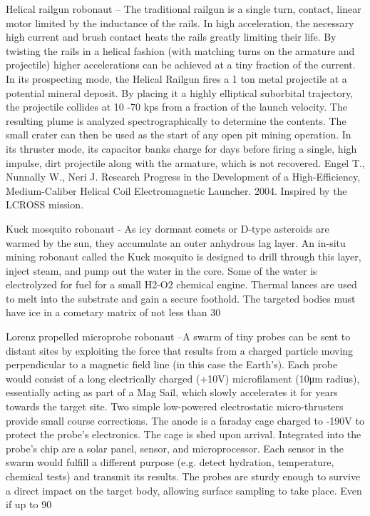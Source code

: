 \documentclass[a4paper]{book}
\begin{document}
Helical railgun robonaut – The traditional railgun is a single turn, contact, linear motor limited by the inductance of the rails.  In high acceleration, the necessary high current and brush contact heats the rails greatly limiting their life.  By twisting the rails in a helical fashion (with matching turns on the armature and projectile) higher accelerations can be achieved at a tiny fraction of the current. In its prospecting mode, the Helical Railgun fires a 1 ton metal projectile at a potential mineral deposit.  By placing it a highly elliptical suborbital trajectory, the projectile collides at 10 -70 kps from a fraction of the launch velocity. The resulting plume is analyzed spectrographically to determine the contents.  The small crater can then be used as the start of any open pit mining operation. In its thruster mode, its capacitor banks charge for days before firing a single, high impulse, dirt projectile along with the armature, which is not recovered. Engel T., Nunnally W., Neri J. Research Progress in the Development of a High-Efficiency, Medium-Caliber Helical Coil Electromagnetic Launcher. 2004. Inspired by the LCROSS mission.
 
Kuck mosquito robonaut - As icy dormant comets or D-type asteroids are warmed by the sun, they accumulate an outer anhydrous lag layer.  An in-situ mining robonaut called the Kuck mosquito is designed to drill through this layer, inject steam, and pump out the water in the core. Some of the water is electrolyzed for fuel for a small H2-O2 chemical engine. Thermal lances are used to melt into the substrate and gain a secure foothold.  The targeted bodies must have ice in a cometary matrix of not less than 30%
 
Lorenz propelled microprobe robonaut –A swarm of tiny probes can be sent to distant sites by exploiting the force that results from a charged particle moving perpendicular to a magnetic field line (in this case the Earth’s).  Each probe would consist of a long electrically charged (+10V) microfilament (10μm radius), essentially acting as part of a Mag Sail, which slowly accelerates it for years towards the target site. Two simple low-powered electrostatic micro-thrusters provide small course corrections.  The anode is a faraday cage charged to -190V to protect the probe’s electronics. The cage is shed upon arrival. Integrated into the probe’s chip are a solar panel, sensor, and microprocessor. Each sensor in the swarm would fulfill a different purpose (e.g. detect hydration, temperature, chemical tests) and transmit its results.  The probes are sturdy enough to survive a direct impact on the target body, allowing surface sampling to take place.  Even if up to 90%
\end{document}
